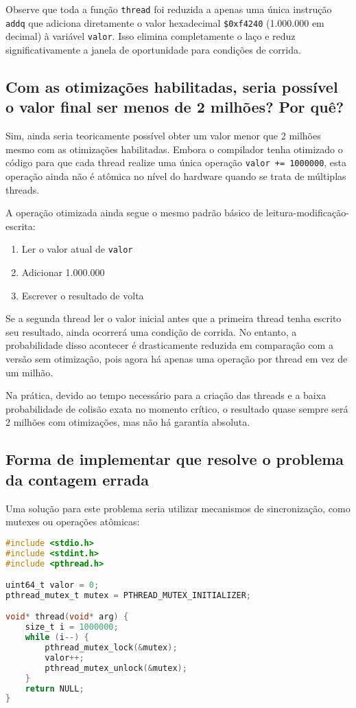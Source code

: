 \documentclass[12pt]{article}
\begin{document}
Observe que toda a função \texttt{thread} foi reduzida a apenas uma única instrução \texttt{addq} que adiciona diretamente o valor hexadecimal \texttt{\$0xf4240} (1.000.000 em decimal) à variável \texttt{valor}. Isso elimina completamente o laço e reduz significativamente a janela de oportunidade para condições de corrida.

\subsection{Com as otimizações habilitadas, seria possível o valor final ser menos de 2 milhões? Por quê?}

Sim, ainda seria teoricamente possível obter um valor menor que 2 milhões mesmo com as otimizações habilitadas. Embora o compilador tenha otimizado o código para que cada thread realize uma única operação \texttt{valor += 1000000}, esta operação ainda não é atômica no nível do hardware quando se trata de múltiplas threads.

A operação otimizada ainda segue o mesmo padrão básico de leitura-modificação-escrita:

\begin{enumerate}
    \item Ler o valor atual de \texttt{valor}
    \item Adicionar 1.000.000
    \item Escrever o resultado de volta
\end{enumerate}

Se a segunda thread ler o valor inicial antes que a primeira thread tenha escrito seu resultado, ainda ocorrerá uma condição de corrida. No entanto, a probabilidade disso acontecer é drasticamente reduzida em comparação com a versão sem otimização, pois agora há apenas uma operação por thread em vez de um milhão.

Na prática, devido ao tempo necessário para a criação das threads e a baixa probabilidade de colisão exata no momento crítico, o resultado quase sempre será 2 milhões com otimizações, mas não há garantia absoluta.

\subsection{Forma de implementar que resolve o problema da contagem errada}

Uma solução para este problema seria utilizar mecanismos de sincronização, como mutexes ou operações atômicas:

\begin{lstlisting}[language=C]
#include <stdio.h>
#include <stdint.h>
#include <pthread.h>

uint64_t valor = 0;
pthread_mutex_t mutex = PTHREAD_MUTEX_INITIALIZER;

void* thread(void* arg) {
    size_t i = 1000000;
    while (i--) {
        pthread_mutex_lock(&mutex);
        valor++;
        pthread_mutex_unlock(&mutex);
    }
    return NULL;
}
\end{lstlisting}
\end{document}
